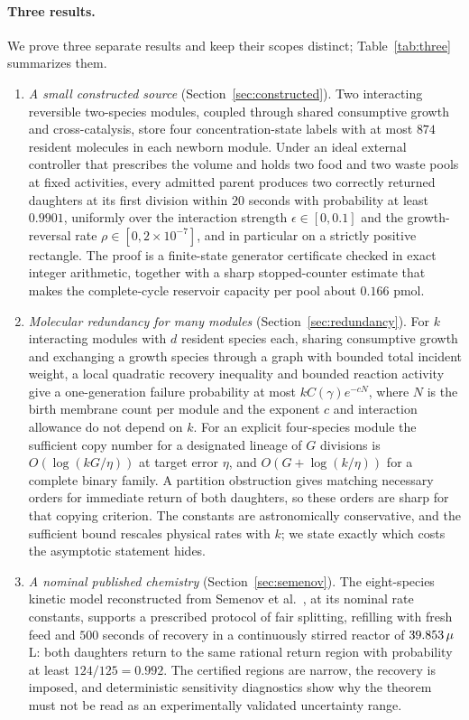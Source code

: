 \paragraph{Three results.}
We prove three separate results and keep their scopes distinct; Table~\ref{tab:three} summarizes them.
\begin{enumerate}[label=(\Alph*)]
\item \emph{A small constructed source} (Section~\ref{sec:constructed}). Two interacting reversible two-species modules, coupled through shared consumptive growth and cross-catalysis, store four concentration-state labels with at most $874$ resident molecules in each newborn module. Under an ideal external controller that prescribes the volume and holds two food and two waste pools at fixed activities, every admitted parent produces two correctly returned daughters at its first division within $20$ seconds with probability at least $0.9901$, uniformly over the interaction strength $\epsilon\in[0,0.1]$ and the growth-reversal rate $\rho\in[0,2\times10^{-7}]$, and in particular on a strictly positive rectangle. The proof is a finite-state generator certificate checked in exact integer arithmetic, together with a sharp stopped-counter estimate that makes the complete-cycle reservoir capacity per pool about $0.166$ pmol.
\item \emph{Molecular redundancy for many modules} (Section~\ref{sec:redundancy}). For $k$ interacting modules with $d$ resident species each, sharing consumptive growth and exchanging a growth species through a graph with bounded total incident weight, a local quadratic recovery inequality and bounded reaction activity give a one-generation failure probability at most $kC(\gamma)e^{-cN}$, where $N$ is the birth membrane count per module and the exponent $c$ and interaction allowance do not depend on $k$. For an explicit four-species module the sufficient copy number for a designated lineage of $G$ divisions is $O(\log(kG/\eta))$ at target error $\eta$, and $O(G+\log(k/\eta))$ for a complete binary family. A partition obstruction gives matching necessary orders for immediate return of both daughters, so these orders are sharp for that copying criterion. The constants are astronomically conservative, and the sufficient bound rescales physical rates with $k$; we state exactly which costs the asymptotic statement hides.
\item \emph{A nominal published chemistry} (Section~\ref{sec:semenov}). The eight-species kinetic model reconstructed from Semenov et al.\ \citep{semenov2016}, at its nominal rate constants, supports a prescribed protocol of fair splitting, refilling with fresh feed and $500$ seconds of recovery in a continuously stirred reactor of $39.853\,\micro$L: both daughters return to the same rational return region with probability at least $124/125=0.992$. The certified regions are narrow, the recovery is imposed, and deterministic sensitivity diagnostics show why the theorem must not be read as an experimentally validated uncertainty range.
\end{enumerate}
